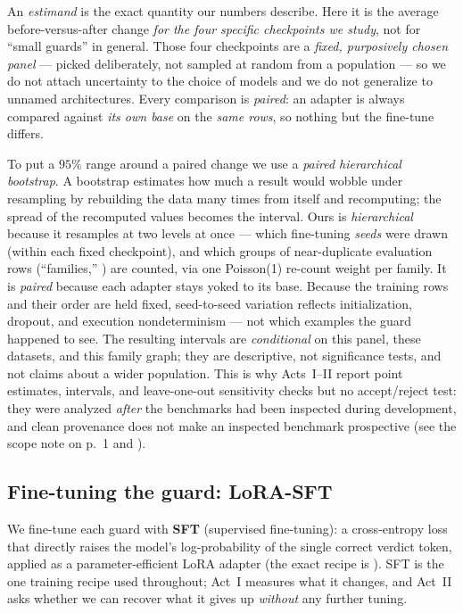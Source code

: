 An \emph{estimand} is the exact quantity our numbers describe. Here it is the average
before-versus-after change \emph{for the four specific checkpoints we study}, not for ``small guards''
in general. Those four checkpoints are a \emph{fixed, purposively chosen panel} --- picked deliberately,
not sampled at random from a population --- so we do not attach uncertainty to the choice of models and
we do not generalize to unnamed architectures. Every comparison is \emph{paired}: an adapter is always
compared against \emph{its own base} on the \emph{same rows}, so nothing but the fine-tune differs.

To put a $95\%$ range around a paired change we use a \emph{paired hierarchical bootstrap}. A bootstrap
estimates how much a result would wobble under resampling by rebuilding the data many times from itself
and recomputing; the spread of the recomputed values becomes the interval. Ours is \emph{hierarchical}
because it resamples at two levels at once --- which fine-tuning \emph{seeds} were drawn (within each
fixed checkpoint), and which groups of near-duplicate evaluation rows (``families,''
) are counted, via one Poisson(1) re-count weight per family. It is \emph{paired}
because each adapter stays yoked to its base. Because the training rows and their order are held fixed,
seed-to-seed variation reflects initialization, dropout, and execution nondeterminism --- not
which examples the guard happened to see. The resulting intervals are \emph{conditional} on this panel,
these datasets, and this family graph; they are descriptive, not significance tests, and not claims
about a wider population. This is why Acts~I--II report point estimates, intervals, and leave-one-out
sensitivity checks but no accept/reject test: they were analyzed \emph{after} the benchmarks had been
inspected during development, and clean provenance does not make an inspected benchmark prospective
(see the scope note on p.~1 and ).

\subsection{Fine-tuning the guard: LoRA-SFT}
\label{sec:bg-objectives}

We fine-tune each guard with \textbf{SFT} (supervised fine-tuning): a cross-entropy loss that directly
raises the model's log-probability of the single correct verdict token, applied as a parameter-efficient
LoRA adapter (the exact recipe is ). SFT is the one training recipe used throughout;
Act~I measures what it changes, and Act~II asks whether we can recover what it gives up \emph{without}
any further tuning.

